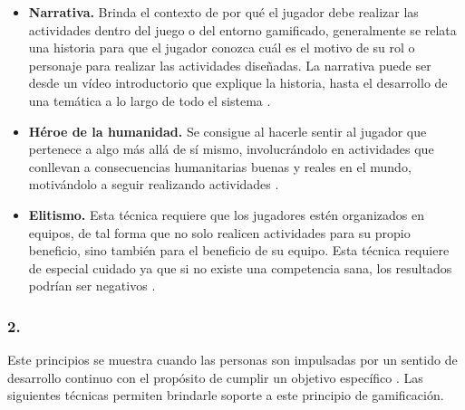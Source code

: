     \begin{itemize}
    \item
    {\bf Narrativa.}
        Brinda el contexto de por qué el jugador debe realizar las actividades dentro del juego o
        del entorno gamificado, generalmente se relata una historia para que el jugador conozca
        cuál es el motivo de su rol o personaje para realizar las actividades diseñadas.
        La narrativa puede ser desde un vídeo introductorio que explique la historia, hasta
        el desarrollo de una temática a lo largo de todo el sistema \cite[p. 81]{Octalysis}.

    \item
    {\bf Héroe de la humanidad.}
        Se consigue al hacerle sentir al jugador que pertenece a algo más allá de sí
        mismo, involucrándolo en actividades que conllevan a consecuencias 
        humanitarias buenas y reales en el mundo, motivándolo a seguir realizando
        actividades \cite[p. 82]{Octalysis}.

    \item
    {\bf Elitismo.}
        Esta técnica requiere que los jugadores estén organizados en equipos, de tal forma que
        no solo realicen actividades para su propio beneficio, sino también para el beneficio
        de su equipo. Esta técnica requiere de especial cuidado ya que si no existe una competencia
        sana, los resultados podrían ser negativos \cite[p. 83]{Octalysis}.

    \end{itemize}

\subsubsection{2. \principioII} \label{subsec:principioII}

 Este principios se muestra cuando las personas son impulsadas por un sentido de desarrollo continuo
 con el propósito de cumplir un objetivo específico \cite[p. 91]{Octalysis}. Las siguientes técnicas
 permiten brindarle soporte a este principio de gamificación.

